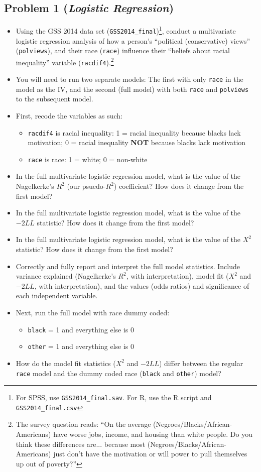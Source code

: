 \documentclass{article}
\begin{document}
\subsection*{Problem 1 (\textit{Logistic Regression})}
\begin{itemize}
\item Using the GSS 2014 data set (\texttt{GSS2014\_final})\footnote{For SPSS, use \texttt{GSS2014\_final.sav}. For R, use the R script and \texttt{GSS2014\_final.csv}}, conduct a multivariate logistic regression analysis of how a person's ``political (conservative) views'' (\texttt{polviews}), and their race (\texttt{race}) influence their ``beliefs about racial inequality'' variable (\texttt{racdif4}).\footnote{The survey question reads: ``On the average (Negroes/Blacks/African-Americans) have worse jobs, income, and housing than white people. Do you think these differences are... because most (Negroes/Blacks/African-Americans) just don't have the motivation or will power to pull themselves up out of poverty?''}
\item You will need to run two separate models: The first with only \texttt{race} in the model as the IV, and the second (full model) with both \texttt{race} and \texttt{polviews} to the subsequent model.
\item First, recode the variables as such:
\begin{itemize}
\item \texttt{racdif4} is racial inequality: 1 = racial inequality because blacks lack motivation; 0 = racial inequality \textbf{NOT} because blacks lack motivation
\item \texttt{race} is race: 1 = white; 0 = non-white
\end{itemize}
\item In the full multivariate logistic regression model, what is the value of the Nagelkerke's $R^{2}$ (our psuedo-$R^{2}$) coefficient? How does it change from the first model?
\item In the full multivariate logistic regression model, what is the value of the $-2LL$ statistic? How does it change from the first model?
\item In the full multivariate logistic regression model, what is the value of the $X^{2}$ statistic? How does it change from the first model?
\item Correctly and fully report and interpret the full model statistics. Include variance explained (Nagelkerke's $R^{2}$, with interpretation), model fit ($X^{2}$ and $-2LL$, with interpretation), and the values (odds ratios) and significance of each independent variable.\\
\item Next, run the full model with race dummy coded:
\begin{itemize}
\item \texttt{black} = 1 and everything else is 0
\item \texttt{other} = 1 and everything else is 0
\end{itemize}
\item How do the model fit statistics ($X^{2}$ and $-2LL$) differ between the regular \texttt{race} model and the dummy coded race (\texttt{black} and \texttt{other}) model?
\end{itemize}
\end{document}
